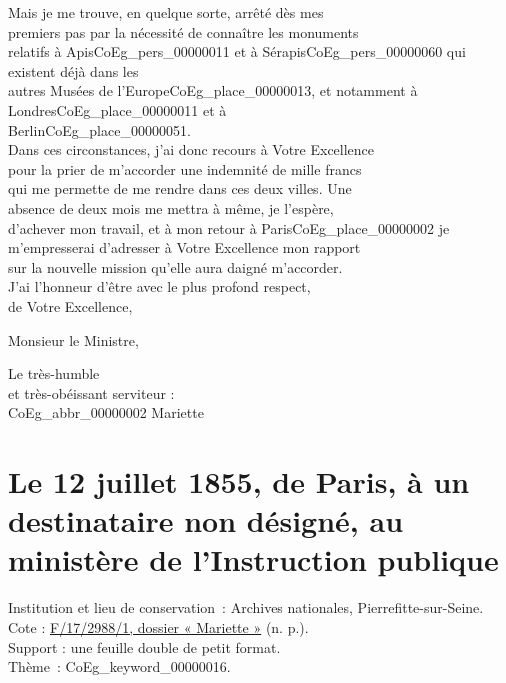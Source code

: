 \documentclass{book}
\begin{document}
\indent Mais je me trouve, en quelque sorte, arrêté dès mes\\
premiers pas par la nécessité de connaître les monuments\\
relatifs à Apis\gls{CoEg_pers_00000011} et à Sérapis\gls{CoEg_pers_00000060} qui existent déjà dans les\\
autres Musées de l’Europe\gls{CoEg_place_00000013}, et notamment à Londres\gls{CoEg_place_00000011} et à\\
Berlin\gls{CoEg_place_00000051}.\\
\indent Dans ces circonstances, j’ai donc recours à Votre Excellence\\
pour la prier de m’accorder une indemnité de mille francs\\
qui me permette de me rendre dans ces deux villes. Une\\
absence de deux mois me mettra à même, je l’espère,\\
d’achever mon travail, et à mon retour à Paris\gls{CoEg_place_00000002} je\\
m’empresserai d’adresser à Votre Excellence mon rapport\\
sur la nouvelle mission qu’elle aura daigné m’accorder.\\
\indent J’ai l’honneur d’être avec le plus profond respect,\\
\indent de Votre Excellence,
\begin{center}Monsieur le Ministre,\end{center}
\begin{center}\hspace{5cm}Le très-humble\\
\hspace{5cm}et très-obéissant serviteur :\\
\hspace{5cm}\gls{CoEg_abbr_00000002} Mariette\end{center}

\hypertarget{CoEg_Mariette_1855-07-12}{}

\section*{Le 12 juillet 1855, de Paris, à un destinataire non désigné, au ministère de l'Instruction publique}
 \label{labCoEg_Mariette_1855-07-12}
{\footnotesize
\noindent Institution et lieu de conservation~: Archives nationales, Pierrefitte-sur-Seine.\\
Cote : \hyperlink{CoEg_Mariette_ms_002}{F/17/2988/1, dossier « Mariette »} (n. p.).\\
Support : une feuille double de petit format.\\
Thème~: \gls{CoEg_keyword_00000016}.}
\end{document}
